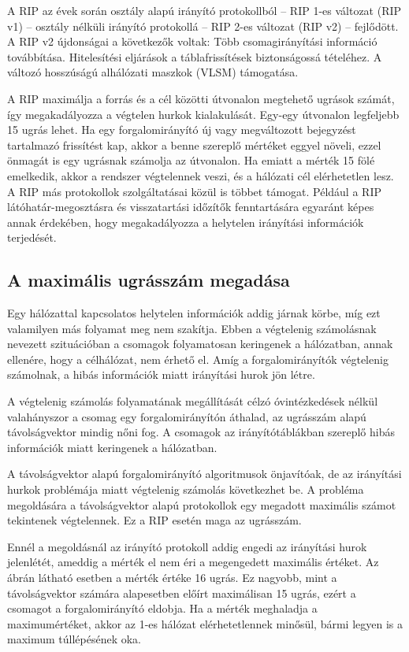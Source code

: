 A RIP az évek során osztály alapú irányító protokollból – RIP 1-es változat (RIP v1) – osztály nélküli irányító protokollá – RIP 2-es változat (RIP v2) – fejlődött. A RIP v2 újdonságai a következők voltak: Több csomagirányítási információ továbbítása. Hitelesítési eljárások a táblafrissítések biztonságossá tételéhez. A változó hosszúságú alhálózati maszkok (VLSM) támogatása.

A RIP maximálja a forrás és a cél közötti útvonalon megtehető ugrások számát, így megakadályozza a végtelen hurkok kialakulását. Egy-egy útvonalon legfeljebb 15 ugrás lehet. Ha egy forgalomirányító új vagy megváltozott bejegyzést tartalmazó frissítést kap, akkor a benne szereplő mértéket eggyel növeli, ezzel önmagát is egy ugrásnak számolja az útvonalon. Ha emiatt a mérték 15 fölé emelkedik, akkor a rendszer végtelennek veszi, és a hálózati cél elérhetetlen lesz. A RIP más protokollok szolgáltatásai közül is többet támogat. Például a RIP látóhatár-megosztásra és visszatartási időzítők fenntartására egyaránt képes annak érdekében, hogy megakadályozza a helytelen irányítási információk terjedését.

\subsection{A maximális ugrásszám megadása}
Egy hálózattal kapcsolatos helytelen információk addig járnak körbe, míg ezt valamilyen más folyamat meg nem szakítja. Ebben a végtelenig számolásnak nevezett szituációban a csomagok folyamatosan keringenek a hálózatban, annak ellenére, hogy a célhálózat, nem érhető el. Amíg a forgalomirányítók végtelenig számolnak, a hibás információk miatt irányítási hurok jön létre.

A végtelenig számolás folyamatának megállítását célzó óvintézkedések nélkül valahányszor a csomag egy forgalomirányítón áthalad, az ugrásszám alapú távolságvektor mindig nőni fog. A csomagok az irányítótáblákban szereplő hibás információk miatt keringenek a hálózatban.

A távolságvektor alapú forgalomirányító algoritmusok önjavítóak, de az irányítási hurkok problémája miatt végtelenig számolás következhet be. A probléma megoldására a távolságvektor alapú protokollok egy megadott maximális számot tekintenek végtelennek. Ez a RIP esetén maga az ugrásszám.

Ennél a megoldásnál az irányító protokoll addig engedi az irányítási hurok jelenlétét, ameddig a mérték el nem éri a megengedett maximális értéket. Az ábrán látható esetben a mérték értéke 16 ugrás. Ez nagyobb, mint a távolságvektor számára alapesetben előírt maximálisan 15 ugrás, ezért a csomagot a forgalomirányító eldobja. Ha a mérték meghaladja a maximumértéket, akkor az 1-es hálózat elérhetetlennek minősül, bármi legyen is a maximum túllépésének oka.

